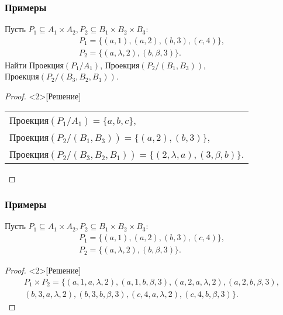 \begin{frame}
    \frametitle{Примеры}

    \begin{example}
        Пусть $P_1\subseteq A_1\times A_2, P_2\subseteq B_1\times B_2\times B_3$:
        \[
            \begin{split}
                P_1=\{(a,1),(a,2),(b,3),(c,4)\},\\
                P_2=\{(a,\lambda,2),(b,\beta,3)\}.
            \end{split}
        \]
        Найти  $\textit{Проекция}(P_1/A_1)$, $\textit{Проекция}(P_2/(B_1,B_3))$, $\textit{Проекция}(P_2/(B_3,B_2,B_1))$.
    \end{example}
    
    \begin{proof}<2>[Решение]
        \begin{tabular}{l}
            $\textit{Проекция}(P_1/A_1)=\{a,b,c\}$,                               \\
            $\textit{Проекция}(P_2/(B_1,B_3))=\{(a,2),(b,3)\}$,                   \\            
            $\textit{Проекция}(P_2/(B_3,B_2,B_1))=\{(2,\lambda,a),(3,\beta,b)\}$. \\
        \end{tabular}
    \end{proof}
\end{frame}

\begin{frame}
    \frametitle{Примеры}

    \begin{example}
        Пусть $P_1\subseteq A_1\times A_2, P_2\subseteq B_1\times B_2\times B_3$:
        \[
            \begin{split}
                P_1=\{(a,1),(a,2),(b,3),(c,4)\},\\
                P_2=\{(a,\lambda,2),(b,\beta,3)\}.
            \end{split}
        \]
    \end{example}
    
    \begin{proof}<2>[Решение]
        \[
            \begin{split}
                P_1\times P_2=\{
                    (a,1,a,\lambda,2),(a,1,b,\beta,3),
                    (a,2,a,\lambda,2),(a,2,b,\beta,3),\\
                    (b,3,a,\lambda,2),(b,3,b,\beta,3), 
                    (c,4,a,\lambda,2),(c,4,b,\beta,3)
                \}.
            \end{split}
        \]
    \end{proof}
\end{frame}

